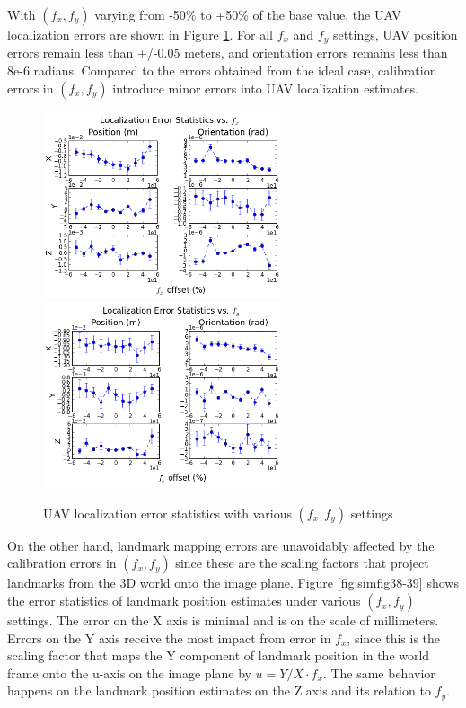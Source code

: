 With $(f_x, f_y)$ varying from -50\% to +50\% of the base value, the
UAV localization errors are shown in Figure \ref{fig:simfig43-44}. For all
$f_x$ and $f_y$ settings, UAV position errors remain less than
+/-0.05 meters, and orientation errors remains less than 8e-6 radians.
Compared to the errors obtained from the ideal case, calibration
errors in $(f_x, f_y)$ introduce minor errors into UAV localization
estimates.
\begin{figure}[h]
  \centering
  \includegraphics[width=7cm,keepaspectratio=true]{./Figures/SimulationFigures/Figure43.png}
  \includegraphics[width=7cm,keepaspectratio=true]{./Figures/SimulationFigures/Figure44.png}
  \caption{UAV localization error statistics with various $(f_x, f_y)$
  settings}
  \label{fig:simfig43-44}
\end{figure}

On the other hand, landmark mapping errors are unavoidably affected by
the calibration errors in $(f_x, f_y)$ since these are the scaling
factors that project landmarks from the 3D world onto the image plane.
Figure \ref{fig:simfig38-39} shows the error statistics of landmark
position estimates under various $(f_x, f_y)$ settings. The error on
the X axis is minimal and is on the scale of millimeters. Errors on
the Y axis receive the most impact from error in $f_x$, since this is
the scaling factor that maps the Y component of landmark position in
the world frame onto the u-axis on the image plane by $u = Y/X \cdot
f_x$. The same behavior happens on the landmark position estimates on
the Z axis and its relation to $f_y$.

